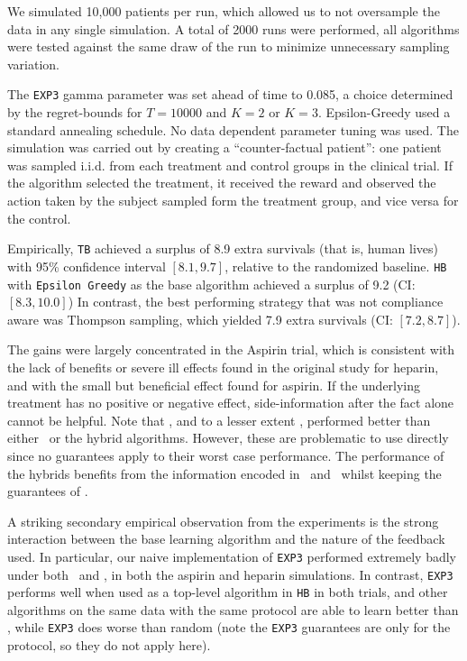 We simulated 10,000 patients per run, which allowed us to not oversample the data in any single simulation. A total of 2000 runs were performed, all algorithms were tested against the same draw of the run to minimize unnecessary sampling variation. 

The \texttt{EXP3} gamma parameter was set ahead of time to 0.085, a choice determined by the regret-bounds for $T=10000$ and $K=2$ or $K=3$. Epsilon-Greedy used a standard annealing schedule. No data dependent parameter tuning was used.
The simulation was carried out by creating a ``counter-factual patient'': one patient was sampled i.i.d. from each treatment and control groups in the clinical trial. If the algorithm selected the treatment, it received the reward and observed the action taken by the subject sampled form the treatment group, and vice versa for the control.


Empirically, \texttt{TB} achieved a surplus of 8.9 extra survivals (that is, human lives) with 95\% confidence interval $[8.1,9.7]$, relative to the randomized baseline.
\texttt{HB} with \texttt{Epsilon Greedy} as the base algorithm achieved a surplus of 9.2 (CI: $[8.3,10.0]$)
In contrast, the best performing strategy that was not compliance aware was Thompson sampling, which yielded 7.9 extra survivals (CI: $[7.2,8.7]$). 

The gains were largely concentrated in the Aspirin trial, which is consistent with the lack of benefits or severe ill effects found in the original study \cite{ist:97} for heparin, and with the small but beneficial effect found for aspirin. 
If the underlying treatment has no positive or negative effect, side-information after the fact alone cannot be helpful.
Note that \actual, and to a lesser extent \comply, performed better than either \chosen\, or the hybrid algorithms. However, these are problematic to use directly since no guarantees apply to their worst case performance. The performance of the hybrids benefits from the information encoded in \actual\, and \comply\, whilst keeping the guarantees of \chosen. 


A striking secondary empirical observation from the experiments is the strong interaction between the base learning algorithm and the nature of the feedback used. In particular, our naive implementation of \texttt{EXP3} performed extremely badly under both \actual\, and \comply, in both the aspirin and heparin simulations. In contrast, \texttt{EXP3} performs well when used as a top-level algorithm in \texttt{HB} in both trials, and other algorithms on the same data with the same protocol are able to learn better than \chosen, while \texttt{EXP3} does worse than random (note the \texttt{EXP3} guarantees are only for the \chosen\, protocol, so they do not apply here).



